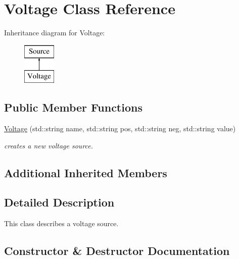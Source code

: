 \hypertarget{class_s_p_i_c_e_1_1_voltage}{}\section{Voltage Class Reference}
\label{class_s_p_i_c_e_1_1_voltage}
Inheritance diagram for Voltage\+:\begin{figure}[H]
\begin{center}
\leavevmode
\includegraphics[height=2.000000cm]{class_s_p_i_c_e_1_1_voltage}
\end{center}
\end{figure}
\subsection*{Public Member Functions}
\begin{DoxyCompactItemize}
\item 
\mbox{\hyperlink{class_s_p_i_c_e_1_1_voltage_ae88c0ca0c1c79404c71ed3f4851a933d}{Voltage}} (std\+::string name, std\+::string pos, std\+::string neg, std\+::string value)
\begin{DoxyCompactList}\small\item\em creates a new voltage source. \end{DoxyCompactList}\end{DoxyCompactItemize}
\subsection*{Additional Inherited Members}


\subsection{Detailed Description}
This class describes a voltage source. 

\subsection{Constructor \& Destructor Documentation}
\mbox{\label{class_s_p_i_c_e_1_1_voltage_ae88c0ca0c1c79404c71ed3f4851a933d}} 
